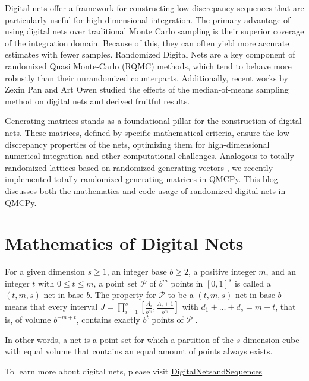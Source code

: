 Digital nets offer a framework for constructing low-discrepancy sequences that are particularly useful for high-dimensional integration. The primary advantage of using digital nets over traditional Monte Carlo sampling is their superior coverage of the integration domain. Because of this, they can often yield more accurate estimates with fewer samples. Randomized Digital Nets are a key component of randomized Quasi Monte-Carlo (RQMC) methods, which tend to behave more robustly than their unrandomized counterparts. Additionally, recent works by Zexin Pan and Art Owen \cite{panowen2022superpolynomial} studied the effects of the median-of-means sampling method on digital nets and derived fruitful results. 

Generating matrices stands as a foundational pillar for the construction of digital nets. These matrices, defined by specific mathematical criteria, ensure the low-discrepancy properties of the nets, optimizing them for high-dimensional numerical integration and other computational challenges. Analogous to totally randomized lattices based on randomized generating vectors \cite{davidblogqtomc2023}, we recently implemented totally randomized generating matrices in QMCPy. This blog discusses both the mathematics and code usage of randomized digital nets in QMCPy. 

\section*{Mathematics of Digital Nets}

For a given dimension \( s \geq 1 \), an integer base \( b \geq 2 \), a positive integer \( m \), and an integer \( t \) with \( 0 \leq t \leq m \), a point set \( \mathcal{P} \) of \( b^m \) points in \( [0,1]^s \) is called a \( (t,m,s) \)-net in base \( b \). The property for \(\mathcal{P}\) to be a \( (t,m,s) \)-net in base \( b \) means that every interval \( J = \prod_{i=1}^s \left[ \frac{A_i}{b^{d_i}}, \frac{A_i + 1}{b^{d_i}} \right] \) with \( d_1 + \ldots + d_s = m - t \), that is, of volume \( b^{-m+t} \), contains exactly \( b^t \) points of \( \mathcal{P} \) \cite{Dick_Pillichshammer_2010}.

In other words, a net is a point set for which a partition of the $s$ dimension cube with equal volume that contains an equal amount of points always exists. 


To learn more about digital nets, please visit \href{/https://web.maths.unsw.edu.au/~josefdick/preprints/DP_book_preprint.pdf}{DigitalNetsandSequences}

